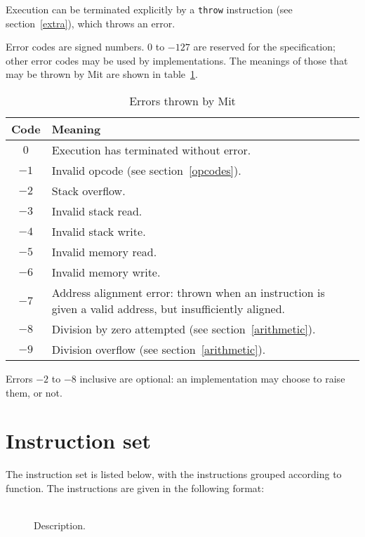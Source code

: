 \documentclass[a4paper]{article}
\newcommand{\spic}[1]{\texttt{\textsl{#1\/}}}
\newlength{\itemwidth}\itemwidth=\textwidth \advance\itemwidth by -0.1in
\newlength{\instname}\instname=0.8in
\newlength{\stackcom}\stackcom=3.7in
\newcommand{\inst}[3]{\item[]\parbox{\itemwidth}%
{\makebox[\instname][l]{\tt #1}%
\makebox[\stackcom][r]{\spic{#2}}\\[0.5ex]#3}}
\begin{document}
Execution can be terminated explicitly by a {\tt throw} instruction (see section~\ref{extra}), which throws an error.

Error codes are signed numbers. $0$ to $-127$ are reserved for the specification; other error codes may be used by implementations. The meanings of those that may be thrown by Mit are shown in table~\ref{errortable}.

\begin{table}[htbp]
\begin{center}
\begin{tabular}{cp{4in}} \toprule
\bf Code & \bf Meaning \\ \midrule
$0$ & Execution has terminated without error. \\
$-1$ & Invalid opcode (see section~\ref{opcodes}). \\
$-2$ & Stack overflow. \\
$-3$ & Invalid stack read. \\
$-4$ & Invalid stack write. \\
$-5$ & Invalid memory read. \\
$-6$ & Invalid memory write. \\
$-7$ & Address alignment error: thrown when an instruction is given a valid address, but insufficiently aligned. \\
$-8$ & Division by zero attempted (see section~\ref{arithmetic}). \\
$-9$ & Division overflow (see section~\ref{arithmetic}). \\
 \bottomrule
\end{tabular}
\caption{\label{errortable}Errors thrown by Mit}
\end{center}
\end{table}

Errors $-2$ to $-8$ inclusive are optional: an implementation may choose to raise them, or not.


\section{Instruction set}
\label{instset}

The instruction set is listed below,
with the instructions grouped according to function. The
instructions are given in the following format:

\begin{description}
\inst{NAME}{before — after}{Description.}
\end{description}
\end{document}
